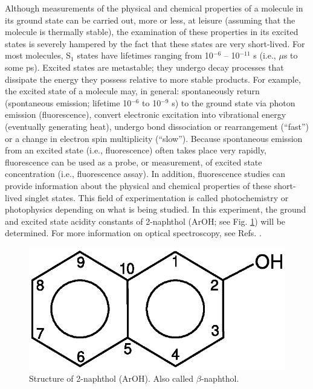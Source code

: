 \documentclass[byrevtex,amssymb,aps,pra,floatfix,letterpaper]{revtex4}
\begin{document}
Although measurements of the physical and chemical properties of a molecule in its ground state can be carried out, more or less, at leisure (assuming that the molecule is thermally stable), the examination of these properties in its excited states is severely hampered by the fact that these states are very short-lived. For most molecules, S$_1$ states have lifetimes ranging from 10$^{-6}$ -- 10$^{-11}$ s (i.e., $\mu$s to some ps). Excited states are metastable; they undergo decay processes that dissipate the energy they possess relative to more stable products. For example, the excited state of a molecule may, in general: spontaneously return (spontaneous emission; lifetime 10$^{-6}$ to 10$^{-9}$ s) to the ground state via photon emission (fluorescence), convert electronic excitation into vibrational energy (eventually generating heat), undergo bond dissociation or rearrangement (``fast'') or a change in electron spin multiplicity (``slow''). Because spontaneous emission from an excited state (i.e., fluorescence) often takes place very rapidly, fluorescence can be used as a probe, or measurement, of excited state concentration (i.e., fluorescence assay). In addition, fluorescence studies can provide information about the physical and chemical properties of these short-lived singlet states. This field of experimentation is called photochemistry or photophysics depending on what is being studied. In this experiment, the ground and excited state acidity constants of 2-naphthol (ArOH; see Fig. \ref{fig1}) will be determined. For more information on optical spectroscopy, see Refs. \cite{ATKINS1, SILBEY, CHANG}.

\begin{figure}[!htp]
\begin{center}
\includegraphics[scale=0.5]{fig1}
\caption{Structure of 2-naphthol (ArOH). Also called $\beta$-naphthol.}
\label{fig1}
\end{center}
\end{figure}
\end{document}
